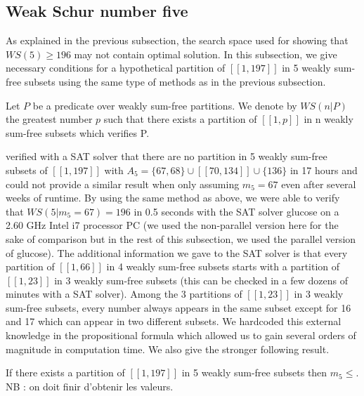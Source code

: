 \subsection{Weak Schur number five}
As explained in the previous subsection, the search space used for showing that \(WS(5) \geqslant 196\) may not contain
optimal solution. In this subsection,
we give necessary conditions for a hypothetical partition of \([\![1,197]\!]\) in 5 weakly sum-free subsets using the
same type of methods as in the
previous subsection.

\begin{notation}
Let \(P\) be a predicate over weakly sum-free partitions. We denote by \(WS(n | P)\) the greatest number \(p\) such that
there exists a partition of
\([\![1,p]\!]\) in n weakly sum-free subsets which verifies P.
\end{notation}

\par
\cite{ELIAHOU2012175} verified with a SAT solver that there are no partition in 5 weakly sum-free subsets of
\([\![1,197]\!]\) with
\(A_5 = \{67, 68\} \cup [\![70,134]\!] \cup \{136\}\) in 17 hours and could not provide a similar result when only
assuming \(m_5 = 67\) even after several
weeks of runtime. By using the same method as above, we were able to verify that \(WS(5 | m_5 = 67) = 196\) in 0.5
seconds with the SAT solver glucose \cite{Glucose}
on a 2.60 GHz Intel i7 processor PC (we used the non-parallel version here for the sake of comparison but in the rest of
this subsection, we used the parallel version of glucose).
The additional information we gave to the SAT solver is that every partition of \([\![1,66]\!]\) in 4 weakly sum-free
subsets starts with a partition of
\([\![1,23]\!]\) in 3 weakly sum-free subsets (this can be checked in a few dozens of minutes with a SAT solver). Among
the 3 partitions of \([\![1,23]\!]\) in
3 weakly sum-free subsets, every number always appears in the same subset except for 16 and 17 which can appear in two
different subsets. We hardcoded
this external knowledge in the propositional formula which allowed us to gain several orders of magnitude in computation
time. We also give the stronger following result.

\begin{computational theorem}
If there exists a partition of \([\![1,197]\!]\) in 5 weakly sum-free subsets then \(m_5 \leq\). NB : on doit finir d'obtenir les valeurs.
\end{computational theorem}


